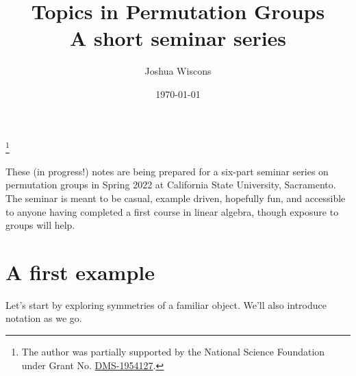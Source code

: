 \documentclass[11pt]{amsart}
\theoremstyle{plain}
\theoremstyle{definition}
\theoremstyle{remark}
\begin{document}
\title[Permutation Groups]{Topics in Permutation Groups\\[7pt] {\footnotesize A short seminar series}}
\author{Joshua Wiscons}
\address{Department of Mathematics and Statistics\\
California State University, Sacramento\\
Sacramento, CA 95819, USA}
\date{\today}
\thanks{The author was partially supported by the National Science Foundation under Grant No. \href{https://www.nsf.gov/awardsearch/showAward?AWD_ID=1954127}{DMS-1954127}.}

\maketitle

\tableofcontents

These (in progress!) notes are being prepared for a six-part seminar series on permutation groups in Spring 2022 at California State University, Sacramento. The seminar is meant to be casual, example driven, hopefully fun, and accessible to anyone having completed a first course in linear algebra, though exposure to groups will help. 

\newpage
\section{A first example}\label{S:first.example}
Let's start by exploring symmetries of a familiar object. We'll also introduce notation as we go.
\end{document}
